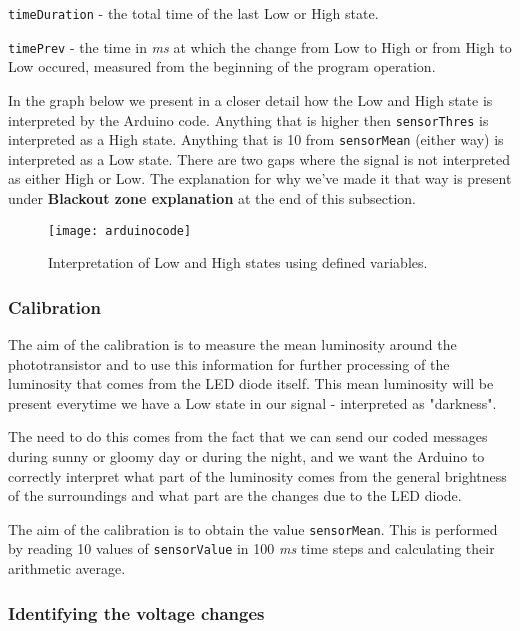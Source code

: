 \documentclass[12pt]{report}
\begin{document}
\verb|timeDuration| - the total time of the last Low or High state.

\verb|timePrev| - the time in \textit{ms} at which the change from Low to High or from High to Low occured, measured from the beginning of the program operation.

In the graph below we present in a closer detail how the Low and High state is interpreted by the Arduino code. Anything that is higher then \verb|sensorThres| is interpreted as a High state. Anything that is 10 from \verb|sensorMean| (either way) is interpreted as a Low state. There are two gaps where the signal is not interpreted as either High or Low. The explanation for why we've made it that way is present under \textbf{Blackout zone explanation} at the end of this subsection.

\begin{figure}[H]
\centering\texttt{[image: arduinocode]}
\caption{Interpretation of Low and High states using defined variables.}				
\label{fig:arduino_code}
\end{figure}



\subsubsection{Calibration}

The aim of the calibration is to measure the mean luminosity around the phototransistor and to use this information for further processing of the luminosity that comes from the LED diode itself. This mean luminosity will be present everytime we have a Low state in our signal - interpreted as "darkness".

The need to do this comes from the fact that we can send our coded messages during sunny or gloomy day or during the night, and we want the Arduino to correctly interpret what part of the luminosity comes from the general brightness of the surroundings and what part are the changes due to the LED diode.

The aim of the calibration is to obtain the value \verb|sensorMean|. This is performed by reading 10 values of \verb|sensorValue| in 100 \textit{ms} time steps and calculating their arithmetic average.

\subsubsection{Identifying the voltage changes}
\end{document}

